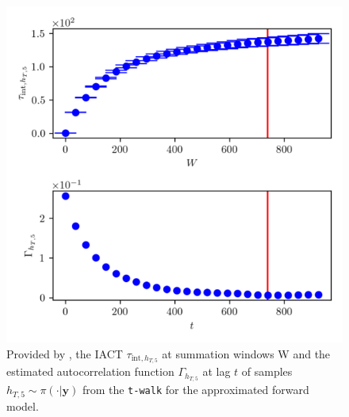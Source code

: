\begin{figure}[ht!]
	\centering
	\includegraphics{UwerrTauIntTWalk14.png}
	\caption[IACT and autocorrelation function of samples $h_{T,5} \sim \pi(\cdot|\bm{y})$, for approximated model.]{Provided by \cite{drikHesse}, the IACT $\tau_{\text{int},h_{T,5}}$ at summation windows W and the estimated autocorrelation function $\Gamma_{h_{T,5}}$ at lag $t$ of samples $h_{T,5} \sim \pi( \cdot| \bm{y})$ from the \texttt{t-walk} for the approximated forward model.}
	\label{fig:TWalkIATC15}
\end{figure}

